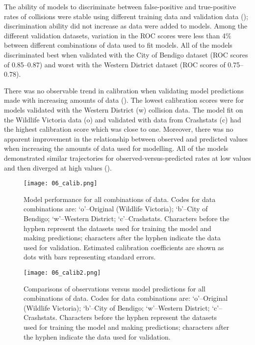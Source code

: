 The ability of models to discriminate between false-positive and true-positive rates of collisions were stable using different training data and validation data (); discrimination ability did not increase as data were added to models. Among the different validation datasets, variation in the ROC scores were less than 4\% between different combinations of data used to fit models. All of the models discriminated best when validated with the City of Bendigo dataset (ROC scores of 0.85--0.87) and worst with the Western District dataset (ROC scores of 0.75--0.78). 

There was no observable trend in calibration when validating model predictions made with increasing amounts of data (). The lowest calibration scores were for models validated with the Western District (w) collision data. The model fit on the Wildlife Victoria data (o) and validated with data from Crashstats (c) had the highest calibration score which was close to one. Moreover, there was no apparent improvement in the relationship between observed and predicted values when increasing the amounts of data used for modelling. All of the models demonstrated similar trajectories for observed-versus-predicted rates at low values and then diverged at high values ().

\begin{figure*}[!h]
  \centering
  \texttt{[image: 06\_calib.png]}
  \caption[Model calibration for all combinations of original and independent data]{Model performance for all combinations of data. Codes for data combinations are: `o'--Original (Wildlife Victoria); `b'--City of Bendigo; `w'--Western District; `c'--Crashstats. Characters before the hyphen represent the datasets used for training the model and making predictions; characters after the hyphen indicate the data used for validation. Estimated calibration coefficients are shown as dots with bars representing standard errors.}
  \label{val_calib}
\end{figure*}

\begin{figure*}[!t]
  \centering
  \texttt{[image: 06\_calib2.png]}
  \caption[Comparisons of observations versus model predictions for all combinations of original and independent data]{Comparisons of observations versus model predictions for all combinations of data. Codes for data combinations are: `o'--Original (Wildlife Victoria); `b'--City of Bendigo; `w'--Western District; `c'--Crashstats. Characters before the hyphen represent the datasets used for training the model and making predictions; characters after the hyphen indicate the data used for validation.}
  \label{val_calib2}
\end{figure*}


